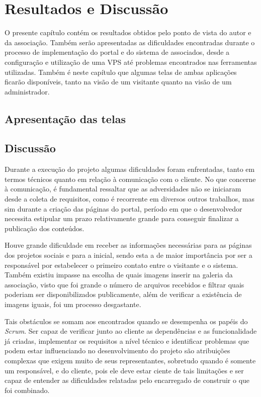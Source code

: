 \chapter{Resultados e Discussão}

O presente capítulo contém os resultados obtidos pelo ponto de vista do autor e da associação. Também serão apresentadas as dificuldades encontradas durante o processo de implementação do portal e do sistema de associados, desde a configuração e utilização de uma VPS até problemas encontrados nas ferramentas utilizadas. Também é neste capítulo que algumas telas de ambas aplicações ficarão disponíveis, tanto na visão de um visitante quanto na visão de um administrador.

\hspace{2.5cm}
\section{Apresentação das telas}
\label{subsec:telas}
\hspace{2.5cm}

\hspace{2.5cm}
\section{Discussão}
\hspace{2.5cm}

Durante a execução do projeto algumas dificuldades foram enfrentadas, tanto em termos técnicos quanto em relação à comunicação com o cliente. No que concerne à comunicação, é fundamental ressaltar que as adversidades não se iniciaram desde a coleta de requisitos, como é recorrente em diversos outros trabalhos, mas sim durante a criação das páginas do portal, período em que o desenvolvedor necessita estipular um prazo relativamente grande para conseguir finalizar a publicação dos conteúdos.

Houve grande dificuldade em receber as informações necessárias para as páginas dos projetos sociais e para a inicial, sendo esta a de maior importância por ser a responsável por estabelecer o primeiro contato entre o visitante e o sistema. Também existiu impasse na escolha de quais imagens inserir na galeria da associação, visto que foi grande o número de arquivos recebidos e filtrar quais poderiam ser disponibilizados publicamente, além de verificar a existência de imagens iguais, foi um processo desgastante.

Tais obstáculos se somam aos encontrados quando se desempenha os papéis do \textit{Scrum}. Ser capaz de verificar junto ao cliente as dependências e as funcionalidade já criadas, implementar os requisitos a nível técnico e identificar problemas que podem estar influenciando no desenvolvimento do projeto são atribuições complexas que exigem muito de seus representantes, sobretudo quando é somente um responsável, e do cliente, pois ele deve estar ciente de tais limitações e ser capaz de entender as dificuldades relatadas pelo encarregado de construir o que foi combinado.

